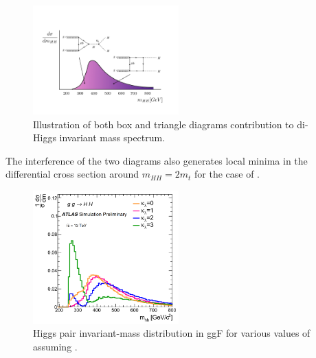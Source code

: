 \begin{figure}[H]
    \centering
    \includegraphics[width=0.5\textwidth]{Ch1/Img/illustration_mHH.jpeg}
    \caption{Illustration of both box and triangle diagrams contribution to di-Higgs invariant mass spectrum.}
    \label{fig:chap1:HH:BSM:I}
\end{figure}
The interference of the two diagrams also generates local minima in the differential cross section around $m_{HH}=2m_t$ for the case of .
\begin{figure}[H]
    \centering
    \includegraphics[width=0.5\textwidth]{Ch1/Img/mHH.png}
    \caption{Higgs pair invariant-mass distribution in ggF for various values of \kl assuming .}
    \label{fig:chap1:HH:BSM:MHH}
\end{figure}

